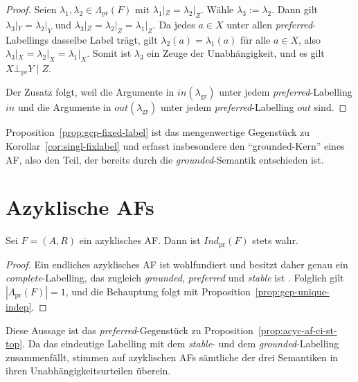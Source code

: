 \begin{proof}
    Seien \(\lambda_1,\lambda_2\in\Lambda_{\mathrm{pr}}(F)\) mit
    \(\lambda_1|_Z=\lambda_2|_Z\). W\"ahle \(\lambda_3:=\lambda_2\). Dann gilt
    \(\lambda_3|_Y=\lambda_2|_Y\) und
    \(\lambda_3|_Z=\lambda_2|_Z=\lambda_1|_Z\). Da jedes \(a\in X\) unter allen
    \textit{preferred}-Labellings dasselbe Label tr\"agt, gilt
    \(\lambda_2(a)=\lambda_1(a)\) f\"ur alle \(a\in X\), also
    \(\lambda_3|_X=\lambda_2|_X=\lambda_1|_X\). Somit ist \(\lambda_3\) ein
    Zeuge der Unabh\"angigkeit, und es gilt \(X\bot_{\mathrm{pr}}Y\mid Z\).

    Der Zusatz folgt, weil die Argumente in
    \(\mathit{in}(\lambda_{\mathrm{gr}})\) unter jedem
    \textit{preferred}-Labelling \(\mathit{in}\) und die Argumente in
    \(\mathit{out}(\lambda_{\mathrm{gr}})\) unter jedem
    \textit{preferred}-Labelling \(\mathit{out}\) sind.
\end{proof}

Proposition~\ref{prop:gcp-fixed-label} ist das mengenwertige Gegenst\"uck zu
Korollar~\ref{cor:singl-fixlabel} und erfasst insbesondere den
\enquote{grounded-Kern} eines AF, also den Teil, der bereits durch die
\textit{grounded}-Semantik entschieden ist.

\section{Azyklische AFs}
\label{sec:gcp-acyc}

\begin{Proposition}
    \label{prop:gcp-acyc-indep}
    Sei \(F=(A,R)\) ein azyklisches AF. Dann ist \(\textit{Ind}_{\mathrm{pr}}(F)\)
    stets wahr.
\end{Proposition}

\begin{proof}
    Ein endliches azyklisches AF ist wohlfundiert und besitzt daher genau ein
    \textit{complete}-Labelling, das zugleich \textit{grounded},
    \textit{preferred} und \textit{stable} ist
    \cite{dung:1995:af}. Folglich gilt \(|\Lambda_{\mathrm{pr}}(F)|=1\), und die
    Behauptung folgt mit Proposition~\ref{prop:gcp-unique-indep}.
\end{proof}

Diese Aussage ist das \textit{preferred}-Gegenst\"uck zu
Proposition~\ref{prop:acyc-af-ci-st-top}. Da das eindeutige Labelling mit dem
\textit{stable}- und dem \textit{grounded}-Labelling zusammenf\"allt, stimmen
auf azyklischen AFs s\"amtliche der drei Semantiken in ihren
Unabh\"angigkeitsurteilen \"uberein.

